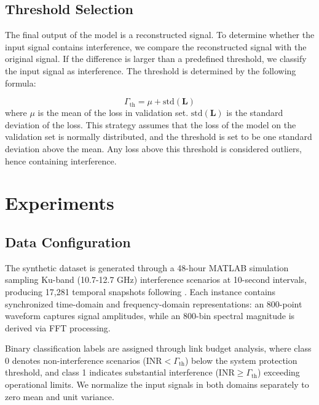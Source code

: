 \documentclass[conference]{IEEEtran}
\begin{document}
\subsection{Threshold Selection}

The final output of the model is a reconstructed signal. To determine whether the input signal contains interference, we compare the reconstructed signal with the original signal. If the difference is larger than a predefined threshold, we classify the input signal as interference. The threshold is determined by the following formula:

\begin{equation}
    \Gamma_{\text{th}} = \mu + \text{std}(\mathbf{L})
\end{equation}
where $\mu$ is the mean of the loss in validation set.  $\text{std}(\mathbf{L})$ is the standard deviation of the loss. This strategy assumes that the loss of the model on the validation set is normally distributed, and the threshold is set to be one standard deviation above the mean. Any loss above this threshold is considered outliers, hence containing interference.



\section{Experiments}
\label{sec:experiments}

\subsection{Data Configuration}

The synthetic dataset is generated through a 48-hour MATLAB simulation sampling Ku-band (10.7-12.7 GHz) interference scenarios at 10-second intervals, producing 17,281 temporal snapshots following \cite{saifaldawlaGenAIBasedModelsNGSO2024}. Each instance contains synchronized time-domain and frequency-domain representations: an 800-point waveform captures signal amplitudes, while an 800-bin spectral magnitude is derived via FFT processing.

Binary classification labels are assigned through link budget analysis, where class 0 denotes non-interference scenarios ($\text{INR} < \Gamma_{\text{th}}$) below the system protection threshold, and class 1 indicates substantial interference ($\text{INR} \geq \Gamma_{\text{th}}$) exceeding operational limits. We normalize the input signals in both domains separately to zero mean and unit variance.
\end{document}
